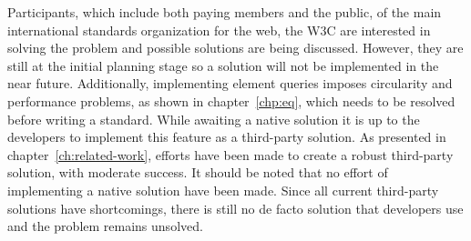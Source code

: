 \documentclass[a4paper,11pt]{kth-mag}
\begin{document}
      Participants, which include both paying members and the public, of the main international standards organization for the \gls{web}, the \gls{W3C} are interested in solving the problem and possible solutions are being discussed.
      However, they are still at the initial planning stage \cite{ricg_site} so a solution will not be implemented  in the near future.
      Additionally, implementing element queries imposes circularity and performance problems, as shown in chapter~\ref{chp:eq}, which needs to be resolved before writing a standard.
      While awaiting a \gls{native} solution it is up to the developers to implement this feature as a \gls{third-party} solution.
      As presented in chapter~\ref{ch:related-work}, efforts have been made to create a robust \gls{third-party} solution, with moderate success.
      It should be noted that no effort of implementing a native solution have been made.
      Since all current \gls{third-party} solutions have shortcomings, there is still no de facto solution that developers use and the problem remains unsolved.
\end{document}

